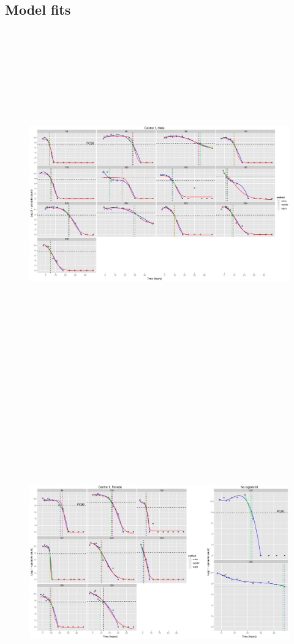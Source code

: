 \begin{singlespace}
\section{Model fits}
\begin{figure}
\includegraphics[height=150mm]{Afits1M.eps}
\end{figure}
\begin{figure}
\includegraphics[height=150mm]{Afits1F.eps}

\end{figure}
\end{singlespace}
